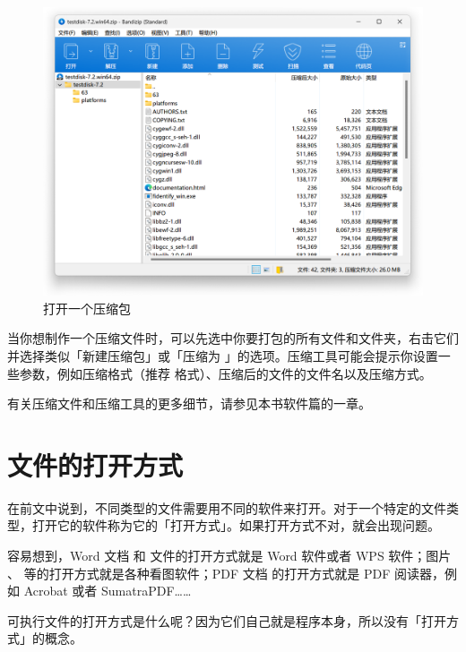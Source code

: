 {{{{\begin{figure}[htb!]
  \centering
  \includegraphics[width=.7\textwidth]{assets/basic/Opened_archive.png}
  \caption{打开一个压缩包}
  \label{}
\end{figure}

当你想制作一个压缩文件时，可以先选中你要打包的所有文件和文件夹，右击它们并选择类似「新建压缩包」或「压缩为 」的选项。压缩工具可能会提示你设置一些参数，例如压缩格式（推荐  格式）、压缩后的文件的文件名以及压缩方式。

有关压缩文件和压缩工具的更多细节，请参见本书软件篇的一章。

\section{文件的打开方式}

在前文中说到，不同类型的文件需要用不同的软件来打开。对于一个特定的文件类型，打开它的软件称为它的「打开方式」。如果打开方式不对，就会出现问题。

容易想到，Word 文档  和  文件的打开方式就是 Word 软件或者 WPS 软件；图片 、  等的打开方式就是各种看图软件；PDF 文档  的打开方式就是 PDF 阅读器，例如 Acrobat 或者 SumatraPDF……

\begin{note}
  可执行文件的打开方式是什么呢？因为它们自己就是程序本身，所以没有「打开方式」的概念。
\end{note}

}}}}

